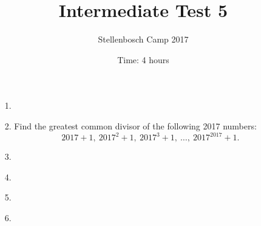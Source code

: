 \documentclass[12pt]{article}
\title{Intermediate Test 5}
\author{Stellenbosch Camp 2017}
\date{Time: 4 hours}
\begin{document}
 \maketitle

\begin{enumerate}

\item[1.] %


\item[2.] %
Find the greatest common divisor of the following 2017 numbers:
  \[ 2017+1,\ 2017^2+1,\ 2017^3+1,\ \dotsc,\ 2017^{2017}+1. \]


\item[3.] %


\item[4.] %
 

\item[5.] %


\item[6.] %


\end{enumerate}

\vfill

\centering
\begin{BVerbatim}
\end{BVerbatim}
\end{document}
